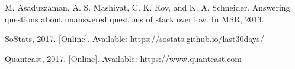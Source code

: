 \documentclass[letterpaper, 10 pt, conference]{ieeeconf}  %
\begin{document}
\begin{thebibliography}{99}
\medbreak
{}M. Asaduzzaman, A. S. Mashiyat, C. K. Roy, and K. A. Schneider. Answering questions about unanswered questions of stack overflow. In MSR, 2013.

\medbreak
{} SoStats, 2017. [Online]. Available: https://sostats.github.io/last30days/

\medbreak
{} Quantcast, 2017. [Online]. Available: https://www.quantcast.com


\end{thebibliography}
\end{document}
